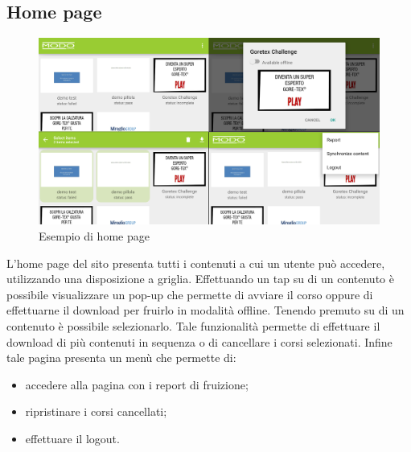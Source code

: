 	\newpage
	\subsection{Home page}
	\begin{figure}[H]
		\centering
		\includegraphics[scale=0.1]{images/prodotto_finale/homex4}
			\caption{Esempio di home page}
	\end{figure}
	L'home page del sito presenta tutti i contenuti a cui un utente può accedere, utilizzando una disposizione a griglia. Effettuando un tap su di un contenuto è possibile visualizzare un pop-up che permette di avviare il corso oppure di effettuarne il download per fruirlo in modalità offline. Tenendo premuto su di un contenuto è possibile selezionarlo. Tale funzionalità permette di effettuare il download di più contenuti in sequenza o di cancellare i corsi selezionati. Infine tale pagina presenta un menù che permette di:
	\begin{itemize}
		\item accedere alla pagina con i report di fruizione;
		\item ripristinare i corsi cancellati;
		\item effettuare il logout.
	\end{itemize}

	\newpage
